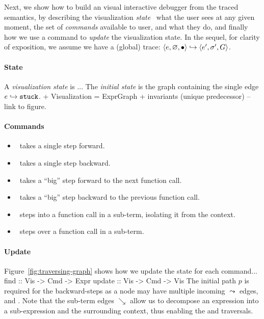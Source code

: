 Next, we show how to build an visual interactive debugger
from the traced semantics, by describing the visualization
\emph{state} \ie\ what the user sees at any given moment,
the set of \emph{commands} available to user, and what
they do, and finally how we use a command to \emph{update}
the visualization state. In the sequel, for clarity of
exposition, we assume we have a (global) trace:
$\langle e, \varnothing, \bullet \rangle \hookrightarrow \langle e', \sigma', G \rangle$.

\paragraph{State}
A \emph{visualization state} is ...
The \emph{initial state} is the graph containing the single edge
${e \hookrightarrow \mathtt{stuck}}$.
+ Visualization = ExprGraph + invariants (unique predecessor) -- link to figure.

\paragraph{Commands}
\begin{itemize}
\item \stepforwardsym\ takes a single step forward.
\item \stepbackwardsym\ takes a single step backward.
\item \jumpforwardsym\ takes a ``big'' step forward to the next function call.
\item \jumpbackwardsym\ takes a ``big'' step backward to the previous function call.
\item \stepintosym\ steps into a function call in a sub-term, isolating it from the context.
\item \stepoversym\ steps over a function call in a sub-term.
\end{itemize}

\paragraph{Update}
Figure~\ref{fig:traversing-graph} shows how we update the state for each
command...
%
find   :: Vis -> Cmd -> Expr
update :: Vis -> Cmd -> Vis
%
The initial path $p$ is required for the backward-steps as a node may
have multiple incoming $\leadsto$ edges, \eg
{} and .
%
Note that the sub-term edges $\searrow$ allow us to decompose an expression into a
sub-expression and the surrounding context, thus enabling the \stepintosym
and \stepoversym traversals.



